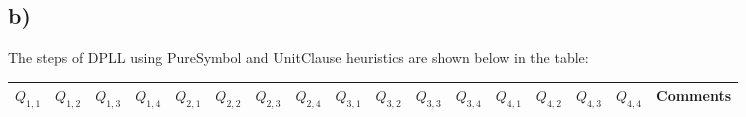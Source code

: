 \documentclass[22pt]{article}
\begin{document}
 \newpage

 \subsection*{b)}

 The steps of DPLL using PureSymbol and UnitClause heuristics are shown below in the table:

 \begin{table}[htbp]
\centering
\small
\setlength\tabcolsep{3pt}
\begin{tabular}{ |c|c|c|c|c|c|c|c|c|c|c|c|c|c|c|c|c| } 
 \hline
 $Q_{1,1}$ & $Q_{1,2}$ & $Q_{1,3}$ & $Q_{1,4}$ & $Q_{2,1}$ & $Q_{2,2}$ & $Q_{2,3}$ & $Q_{2,4}$ & $Q_{3,1}$ &
  $Q_{3,2}$ & $Q_{3,3}$ & $Q_{3,4}$ & $Q_{4,1}$ & $Q_{4,2}$ & $Q_{4,3}$ & $Q_{4,4}$ & Comments\\ \hline


\end{tabular}
\end{table}
\end{document}
